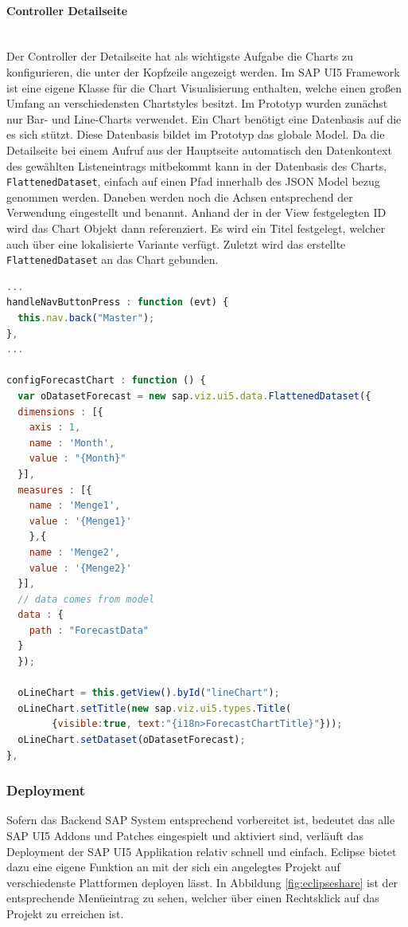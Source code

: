 \paragraph{Controller Detailseite}$\;$ \\
Der Controller der Detailseite hat als wichtigste Aufgabe die Charts zu konfigurieren, die unter der Kopfzeile angezeigt werden. Im SAP UI5 Framework ist eine eigene Klasse für die Chart Visualisierung enthalten, welche einen großen Umfang an verschiedensten Chartstyles besitzt. Im Prototyp wurden zunächst nur Bar- und Line-Charts verwendet. Ein Chart benötigt eine Datenbasis auf die es sich stützt. Diese Datenbasis bildet im Prototyp das globale Model. Da die Detailseite bei einem Aufruf aus der Hauptseite automatisch den Datenkontext des gewählten Listeneintrags mitbekommt kann in der Datenbasis des Charts, \texttt{FlattenedDataset}, einfach auf einen Pfad innerhalb des JSON Model bezug genommen werden. Daneben werden noch die Achsen entsprechend der Verwendung eingestellt und benannt. Anhand der in der View festgelegten ID wird das Chart Objekt dann referenziert. Es wird ein Titel festgelegt, welcher auch über eine lokalisierte Variante verfügt. Zuletzt wird das erstellte \texttt{FlattenedDataset} an das Chart gebunden.

\vspace{1em}
\begin{lstlisting}[language=JavaScript, caption=Chart Konfigurierung, label=lst:chartconfig]
...
handleNavButtonPress : function (evt) {
  this.nav.back("Master");
},
...
	
configForecastChart : function () {
  var oDatasetForecast = new sap.viz.ui5.data.FlattenedDataset({
  dimensions : [{
    axis : 1,
    name : 'Month',
    value : "{Month}"
  }],
  measures : [{
    name : 'Menge1',
    value : '{Menge1}'
    },{
    name : 'Menge2',
    value : '{Menge2}'
  }],		
  // data comes from model
  data : {
    path : "ForecastData"
  }
  });

  oLineChart = this.getView().byId("lineChart");
  oLineChart.setTitle(new sap.viz.ui5.types.Title(
        {visible:true, text:"{i18n>ForecastChartTitle}"}));
  oLineChart.setDataset(oDatasetForecast);
},
\end{lstlisting}

\subsubsection{Deployment}
Sofern das Backend SAP System entsprechend vorbereitet ist, bedeutet das alle SAP UI5 Addons und Patches eingespielt und aktiviert sind, verläuft das Deployment der SAP UI5 Applikation relativ schnell und einfach. Eclipse bietet dazu eine eigene Funktion an mit der sich ein angelegtes Projekt auf verschiedenste Plattformen deployen lässt. In Abbildung \ref{fig:eclipseshare} ist der entsprechende Menüeintrag zu sehen, welcher über einen Rechtsklick auf das Projekt zu erreichen ist.


